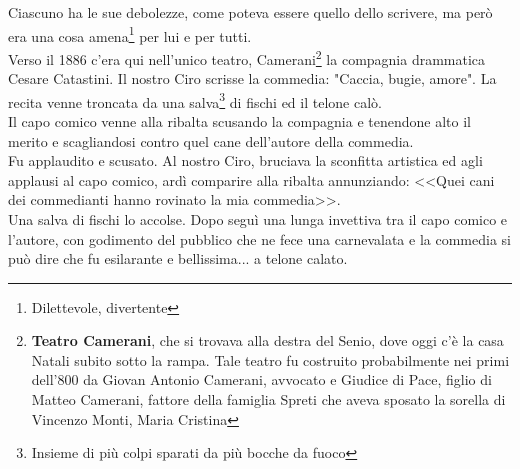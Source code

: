 Ciascuno ha le sue debolezze, come poteva essere quello dello scrivere, ma però era una cosa amena\footnote{Dilettevole, divertente} per lui e per tutti. \\
\indent Verso il 1886 c'era qui nell'unico teatro, Camerani\footnote{\textbf{Teatro Camerani}, che si trovava alla destra del Senio, dove oggi c'è la casa Natali subito sotto la rampa. Tale teatro fu costruito probabilmente nei primi dell'800 da Giovan Antonio Camerani, avvocato e Giudice di Pace, figlio di Matteo Camerani, fattore della famiglia Spreti che aveva sposato la sorella di Vincenzo Monti, Maria Cristina} la compagnia drammatica Cesare Catastini. Il nostro Ciro scrisse la commedia: "Caccia, bugie, amore". La recita venne troncata da una salva\footnote{Insieme di più colpi sparati da più bocche da fuoco} di fischi ed il telone calò.\\
\indent Il capo comico venne alla ribalta scusando la compagnia e tenendone alto il merito e scagliandosi contro quel cane dell'autore della commedia.\\
\indent Fu applaudito e scusato. Al nostro Ciro, bruciava la sconfitta artistica ed agli applausi al capo comico, ardì comparire alla ribalta annunziando: <<Quei cani dei commedianti hanno rovinato la mia commedia>>.\\
\indent Una salva di fischi lo accolse. Dopo seguì una lunga invettiva tra il capo comico e l'autore, con godimento del pubblico che ne fece una carnevalata e la commedia si può dire che fu esilarante e bellissima... a telone calato. 

